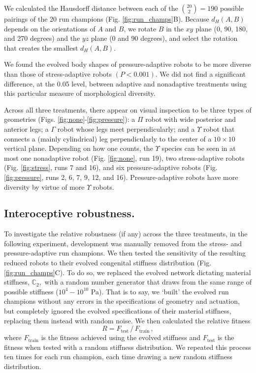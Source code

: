 We calculated the Hausdorff distance between each of the $\binom{20}{2}=190$ possible pairings of the 20 run champions (Fig. \ref{fig:run_champs}B).
Because $d_H(A,B)$ depends on the orientations of $A$ and $B$, we rotate $B$ in the $xy$ plane (0, 90, 180, and 270 degrees) and the $yz$ plane (0 and 90 degrees), and select the rotation that creates the smallest $d_H(A,B)$.

We found the evolved body shapes of pressure-adaptive robots to be more diverse than those of stress-adaptive robots $(P<0.001)$.
We did not find a significant difference, at the 0.05 level, between adaptive and nonadaptive treatments using this particular measure of morphological diversity.

Across all three treatments,
there appear on visual inspection to be three types of geometries (Figs. \ref{fig:none}-\ref{fig:pressure}): a $\Pi$ robot with wide posterior and anterior legs; a $\Gamma$ robot whose legs meet perpendicularly; and a $\Upsilon$ robot that connects a (mainly cylindrical) leg perpendicularly to the center of a $10\times10$ vertical plane.
Depending on how one counts, the $\Upsilon$ species can be seen in at most one nonadaptive robot (Fig. \ref{fig:none}, run 19), two stress-adaptive robots (Fig. \ref{fig:stress}, runs 7 and 16), and six pressure-adaptive robots (Fig. \ref{fig:pressure}, runs 2, 6, 7, 9, 12, and 16).
Pressure-adaptive robots have more diversity by virtue of more $\Upsilon$ robots.


\subsection{Interoceptive robustness.}

To investigate the relative robustness (if any) across the three treatments,
in the following experiment, development was manually removed from the stress- and pressure-adaptive run champions.
We then tested the sensitivity of the resulting reduced robots to their evolved congenital stiffness distribution (Fig. \ref{fig:run_champs}C).
To do so, we replaced the evolved network dictating material stiffness, $\mathbb{C}_2,$ with a random number generator that draws from the same range of possible stiffness ($10^4 - 10^{10}$ Pa).
That is to say, we `built' the evolved run champions without any errors in the specifications of geometry and actuation, but completely ignored the evolved specifications of their material stiffness, replacing them instead with random noise.
We then calculated the relative fitness
\begin{equation}
\label{eq:robustness}
R = F_{\text{test}}\,/\,F_{\text{train}} \, ,
\end{equation}
where $F_{\text{train}}$ is the fitness achieved using the evolved stiffness and $F_{\text{test}}$ is the fitness when tested with a random stiffness distribution.
We repeated this process ten times for each run champion, each time drawing a new random stiffness distribution.



